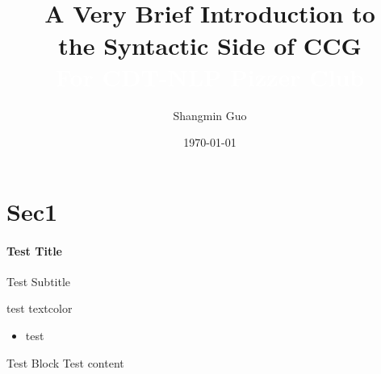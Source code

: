 \documentclass[mathserif,xcolor=dvipsnames,svgnames,aspectratio=43,compress]{beamer}
\begin{document}
\title{\\\medskip \LARGE{A Very Brief Introduction to \\ the Syntactic Side of CCG} %
    \\\medskip
    \Large\textcolor{white}{For CDT-NLP Pizzer Club}}
    
\author{\large{Shangmin Guo}}
\date[\today]{\today} %

\begin{frame}
    \titlepage
\end{frame}

\section{Sec1}

\begin{frame}[t]
    \framesubtitle{Test Title}{Test Subtitle}

    test textcolor

    \begin{itemize}
        \item test
    \end{itemize}

    \begin{block}{Test Block}
        Test content
    \end{block}

\end{frame}
\end{document}
